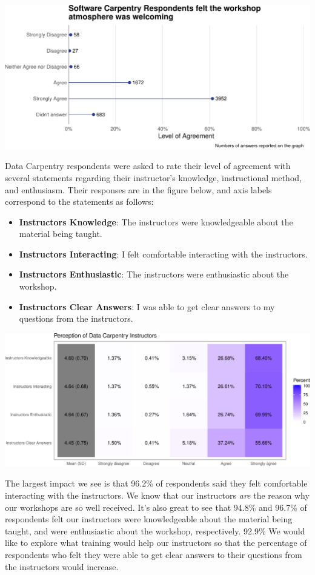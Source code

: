 \documentclass[]{article}
\providecommand{\tightlist}{%
  \setlength{\itemsep}{0pt}\setlength{\parskip}{0pt}}
\begin{document}
\includegraphics[width=720]{figures/swc-post-workshop-environment-1}

Data Carpentry respondents were asked to rate their level of agreement
with several statements regarding their instructor's knowledge,
instructional method, and enthusiasm. Their responses are in the figure
below, and axis labels correspond to the statements as follows:

\begin{itemize}
\tightlist
\item
  \textbf{Instructors Knowledge}: The instructors were knowledgeable
  about the material being taught.
\item
  \textbf{Instructors Interacting}: I felt comfortable interacting with
  the instructors.
\item
  \textbf{Instructors Enthusiastic}: The instructors were enthusiastic
  about the workshop.
\item
  \textbf{Instructors Clear Answers}: I was able to get clear answers to
  my questions from the instructors.
\end{itemize}

\includegraphics[width=720]{figures/dc-perception-instructors-heatmap-1}

The largest impact we see is that 96.2\% of respondents said they felt
comfortable interacting with the instructors. We know that our
instructors \emph{are} the reason why our workshops are so well
received. It's also great to see that 94.8\% and 96.7\% of respondents
felt our instructors were knowledgeable about the material being taught,
and were enthusiastic about the workshop, respectively. 92.9\% We would
like to explore what training would help our instructors so that the
percentage of respondents who felt they were able to get clear answers
to their questions from the instructors would increase.
\end{document}

